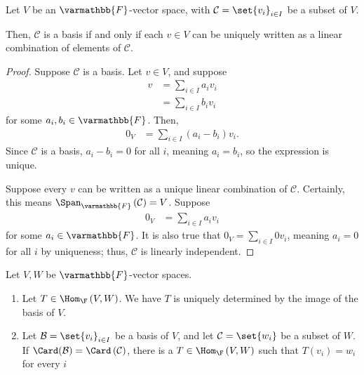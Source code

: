 \documentclass[10pt]{mypackage}
\renewcommand*{\mathbb}[1]{\varmathbb{#1}}
\begin{document}
\begin{lemma}
  Let $V$ be an $\mathbb{F}$-vector space, with $\mathcal{C} = \set{v_i}_{i\in I}$ be a subset of $V$.\newline

  Then, $\mathcal{C}$ is a basis if and only if each $v\in V$ can be uniquely written as a linear combination of elements of $\mathcal{C}$.
\end{lemma}
\begin{proof}
  Suppose $\mathcal{C}$ is a basis. Let $v\in V$, and suppose
  \begin{align*}
    v &= \sum_{i\in I}a_iv_i\\
      &= \sum_{i\in I}b_iv_i
  \end{align*}
  for some $a_i,b_i\in \mathbb{F}$. Then,
  \begin{align*}
    0_V &= \sum_{i\in I}\left(a_i - b_i\right)v_i.
  \end{align*}
  Since $\mathcal{C}$ is a basis, $a_i - b_i = 0$ for all $i$, meaning $a_i = b_i$, so the expression is unique.\newline

  Suppose every $v$ can be written as a unique linear combination of $\mathcal{C}$. Certainly, this means $\Span_{\mathbb{F}}\left(\mathcal{C}\right) = V$. Suppose
  \begin{align*}
    0_V &= \sum_{i\in I}a_iv_i
  \end{align*}
  for some $a_i\in \mathbb{F}$. It is also true that $0_V = \sum_{i\in I}0v_i$, meaning $a_i = 0$ for all $i$ by uniqueness; thus, $\mathcal{C}$ is linearly independent.
\end{proof}
\begin{proposition}
  Let $V,W$ be $\mathbb{F}$-vector spaces.
  \begin{enumerate}[(1)]
    \item Let $T\in \Hom_{\F}\left(V,W\right)$. We have $T$ is uniquely determined by the image of the basis of $V$.
    \item Let $\mathcal{B}=\set{v_i}_{i\in I}$ be a basis of $V$, and let $\mathcal{C} = \set{w_i}$ be a subset of $W$. If $\Card(\mathcal{B}) = \Card\left(\mathcal{C}\right)$, there is a $T\in \Hom_{\F}\left(V,W\right)$ such that $T\left(v_i\right) = w_i$ for every $i$
  \end{enumerate}
\end{proposition}
\end{document}
